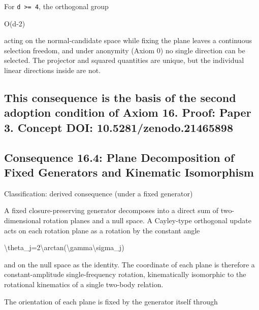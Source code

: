 \documentclass[
  a4paper,
]{article}
\newenvironment{Shaded}{}{}
\newcommand{\NormalTok}[1]{#1}
\begin{document}
For \texttt{d\ \textgreater{}=\ 4}, the orthogonal group

\begin{Shaded}
\begin{Highlighting}[]
\NormalTok{O(d{-}2)}
\end{Highlighting}
\end{Shaded}

acting on the normal-candidate space while fixing the plane leaves a
continuous selection freedom, and under anonymity (Axiom 0) no single
direction can be selected. The projector and squared quantities are
unique, but the individual linear directions inside are not.

\subsection{This consequence is the basis of the second adoption
condition of Axiom 16. Proof: Paper 3. Concept DOI:
10.5281/zenodo.21465898}\label{this-consequence-is-the-basis-of-the-second-adoption-condition-of-axiom-16.-proof-paper-3.-concept-doi-10.5281zenodo.21465898}

\subsection{Consequence 16.4: Plane Decomposition of Fixed Generators
and Kinematic
Isomorphism}\label{consequence-16.4-plane-decomposition-of-fixed-generators-and-kinematic-isomorphism}

Classification: derived consequence (under a fixed generator)

A fixed closure-preserving generator decomposes into a direct sum of
two-dimensional rotation planes and a null space. A Cayley-type
orthogonal update acts on each rotation plane as a rotation by the
constant angle

\begin{Shaded}
\begin{Highlighting}[]
\NormalTok{\textbackslash{}theta\_j=2\textbackslash{}arctan(\textbackslash{}gamma\textbackslash{}sigma\_j)}
\end{Highlighting}
\end{Shaded}

and on the null space as the identity. The coordinate of each plane is
therefore a constant-amplitude single-frequency rotation, kinematically
isomorphic to the rotational kinematics of a single two-body relation.

The orientation of each plane is fixed by the generator itself through
\end{document}
